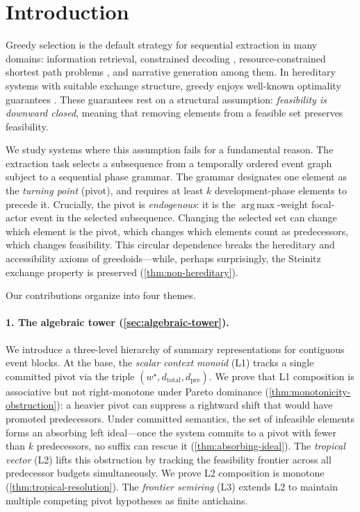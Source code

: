 \documentclass[11pt]{article}
\theoremstyle{plain}
\theoremstyle{definition}
\theoremstyle{remark}
\newcommand{\wstar}{{w^{\star}}}
\newcommand{\dtotal}{{d_{\mathrm{total}}}}
\newcommand{\dpre}[1][]{d_{\mathrm{pre}#1}}
\DeclareMathOperator*{\argmax}{arg\,max}
\begin{document}
\section{Introduction}\label{sec:introduction}

Greedy selection is the default strategy for sequential extraction in
many domains: information retrieval, constrained decoding
\cite{scholak2021picard,willard2023efficient}, resource-constrained
shortest path problems \cite{irnich2005shortest}, and narrative
generation among them.  In hereditary systems with suitable exchange
structure, greedy enjoys well-known optimality guarantees
\cite{korte1981greedoids,bjorner1992introduction}.  These guarantees
rest on a structural assumption: \emph{feasibility is downward closed},
meaning that removing elements from a feasible set preserves
feasibility.

We study systems where this assumption fails for a fundamental reason.
The extraction task selects a subsequence from a temporally ordered
event graph subject to a sequential phase grammar.  The grammar
designates one element as the \emph{turning point} (pivot), and
requires at least $k$ development-phase elements to precede it.
Crucially, the pivot is \emph{endogenous}: it is the $\argmax$-weight
focal-actor event in the selected subsequence.  Changing the selected
set can change which element is the pivot, which changes which elements
count as predecessors, which changes feasibility.  This circular
dependence breaks the hereditary and accessibility axioms of
greedoids---while, perhaps surprisingly, the Steinitz exchange property
is preserved (\cref{thm:non-hereditary}).

Our contributions organize into four themes.

\paragraph{1. The algebraic tower (\cref{sec:algebraic-tower}).}
We introduce a three-level hierarchy of summary representations for
contiguous event blocks.  At the base, the \emph{scalar context monoid}
(L1) tracks a single committed pivot via the triple
$(\wstar, \dtotal, \dpre)$.  We prove that L1 composition is
associative but not right-monotone under Pareto dominance
(\cref{thm:monotonicity-obstruction}): a heavier pivot can suppress a
rightward shift that would have promoted predecessors.  Under committed
semantics, the set of infeasible elements forms an absorbing left
ideal---once the system commits to a pivot with fewer than $k$
predecessors, no suffix can rescue it
(\cref{thm:absorbing-ideal}).  The \emph{tropical vector} (L2) lifts
this obstruction by tracking the feasibility frontier across all
predecessor budgets simultaneously.  We prove L2 composition is
monotone (\cref{thm:tropical-resolution}).  The \emph{frontier
semiring} (L3) extends L2 to maintain multiple competing pivot
hypotheses as finite antichains.
\end{document}
